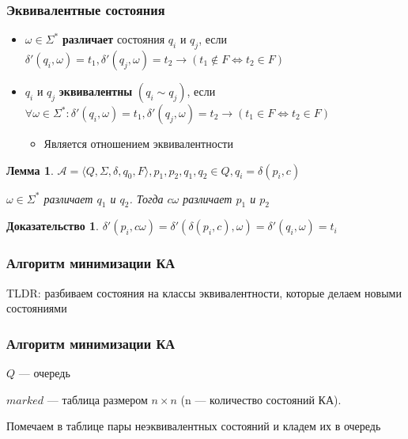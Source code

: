 \documentclass{beamer}
\newtheorem{ruproof}{Доказательство}
\newtheorem{rulemma}{Лемма}
\def\iff{\Leftrightarrow}
\begin{document}
\begin{frame}[fragile]
  \transwipe[direction=90]
  \frametitle{Эквивалентные состояния}
  \begin{itemize}
    \item $\omega \in \Sigma^*$ \textbf{различает} состояния $q_i$ и $q_j$, если $\delta' (q_i, \omega) = t_1, \delta' (q_j, \omega) = t_2 \to (t_1 \notin F \iff t_2 \in F)$
    \item $q_i$ и $q_j$ \textbf{эквивалентны} $(q_i \sim q_j)$, если $\forall \omega \in \Sigma^*: \delta' (q_i, \omega) = t_1, \delta' (q_j, \omega) = t_2 \to (t_1 \in F \iff t_2 \in F)$
    \begin{itemize}
      \item Является отношением эквивалентности
    \end{itemize}
  \end{itemize}
   \begin{rulemma}
      $\mathcal{A} = \langle Q, \Sigma, \delta, q_0, F \rangle, p_1, p_2, q_1, q_2 \in Q, q_i = \delta(p_i, c)$

      $\omega \in \Sigma^*$ различает $q_1$ и $q_2$. Тогда $c \omega$ различает $p_1$ и $p_2$
   \end{rulemma}

   \begin{ruproof}
     $\delta' (p_i, c \omega) = \delta' (\delta (p_i, c), \omega) = \delta' (q_i, \omega) = t_i$
   \end{ruproof}
\end{frame}

\begin{frame}[fragile]
  \transwipe[direction=90]
  \frametitle{Алгоритм минимизации КА}
    TLDR: разбиваем состояния на классы эквивалентности, которые делаем новыми состояниями

\end{frame}

\begin{frame}[fragile]
  \transwipe[direction=90]
  \frametitle{Алгоритм минимизации КА}

     $Q$ --- очередь

     \vspace{10pt}

     $marked$ --- таблица размером $n \times n$ (n --- количество состояний КА).

     \vspace{10pt}

      Помечаем в таблице пары неэквивалентных состояний и кладем их в очередь

\end{frame}
\end{document}
